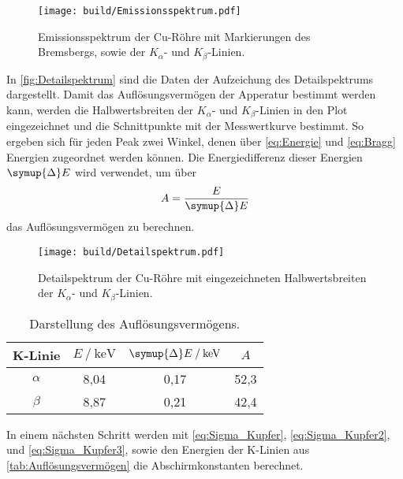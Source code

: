 \begin{figure}[H]
  \centering
  \texttt{[image: build/Emissionsspektrum.pdf]}
  \caption{Emissionsspektrum der Cu-Röhre mit Markierungen des Bremsbergs, sowie der $K_{\alpha}$- und $K_{\beta}$-Linien.}
  \label{fig:Emissionsspektrum}
\end{figure}

In \autoref{fig:Detailspektrum} sind die Daten der Aufzeichung des Detailspektrums dargestellt. Damit das Auflösungsvermögen
der Apperatur bestimmt werden kann, werden die Halbwertsbreiten der $K_{\alpha}$- und $K_{\beta}$-Linien in den Plot eingezeichnet 
und die Schnittpunkte mit der Messwertkurve bestimmt. So ergeben sich für jeden Peak zwei Winkel, denen über \eqref{eq:Energie} und \eqref{eq:Bragg}
Energien zugeordnet werden können. Die Energiedifferenz dieser Energien $\symup{\Delta}E$ wird verwendet, um über
\begin{equation*}
  A = \frac{E}{\symup{\Delta}E}
\end{equation*}
das Auflösungsvermögen zu berechnen. 

\begin{figure}[H]
  \centering
  \texttt{[image: build/Detailspektrum.pdf]}
  \caption{Detailspektrum der Cu-Röhre mit eingezeichneten Halbwertsbreiten der $K_{\alpha}$- und $K_{\beta}$-Linien.}
  \label{fig:Detailspektrum}
\end{figure}

\begin{table}
  \centering
  \caption{Darstellung des Auflösungsvermögens.}
  \label{tab:Auflösungsvermögen}
  \begin{tabular}{c S[table-format=1.2] S[table-format=1.2] S[table-format=2.1]}
    \toprule
    {K-Linie} & {$E \mathbin{/} \unit{\kilo\electronvolt}$} & {$\symup{\Delta}E \mathbin{/} \unit{\kilo\electronvolt}$} &%
    {$A$}\\
    \midrule
    $\alpha$  & 8,04 & 0,17 & 52,3 \\
    $\beta$   & 8,87 & 0,21 & 42,4 \\
    \bottomrule
  \end{tabular}
\end{table}

In einem nächsten Schritt werden mit \eqref{eq:Sigma_Kupfer}, \eqref{eq:Sigma_Kupfer2}, und \eqref{eq:Sigma_Kupfer3}, sowie den
Energien der K-Linien aus \autoref{tab:Auflösungsvermögen} die Abschirmkonstanten berechnet. 


